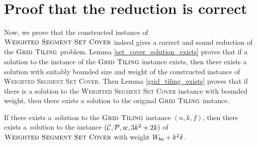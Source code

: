 \section{Proof that the reduction is correct}

Now, we prove that the constructed instance of $\textsc{Weighted Segment Set Cover}$
indeed gives a correct and sound reduction
of the $\textsc{Grid Tiling}$ problem. Lemma \ref{set_cover_solution_exists}
proves that if a solution to the instance of the $\textsc{Grid Tiling}$ instance exists,
then there exists a solution with suitably bounded size and weight
of the constructed instance of
\textsc{Weighted} \textsc{Segment} \textsc{Set} \textsc{Cover}.
Then Lemma \ref{grid_tiling_exists} proves that if
there is a solution to the
\textsc{Weighted} \textsc{Segment} \textsc{Set} \textsc{Cover}
instance with bounded weight,
then there exists a solution to the original $\textsc{Grid Tiling}$ instance.

\begin{lemma}
\label{set_cover_solution_exists}
	If there exists a~solution to the $\textsc{Grid Tiling}$ instance $(n,k,f)$,
	then there exists a~solution to the instance $(\mathcal{C}, \mathcal{P}, w, 3k^2+2k)$
	of $\textsc{Weighted Segment Set Cover}$ with weight $W_{\mathsf{hv}}+k^2\delta$.
\end{lemma}

